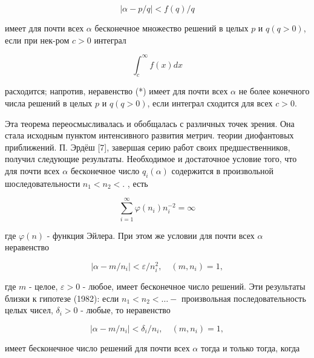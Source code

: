 \documentclass[10pt]{article}
\begin{document}
\[

|\alpha-p / q|<f(q) / q

\]



имеет для почти всех $\alpha$ бесконечное множество решений в целых $p$ и $q(q>0)$, если при нек-ром $c>0$ интеграл



\[

\int_{c}^{\infty} f(x) d x

\]



расходится; напротив, неравенство (*) имеет для почти всех $\alpha$ не более конечного числа решений в целых $p$ и $q(q>0)$, если интеграл сходится для всех $c>0$.



Эта теорема переосмысливалась и обобщалась с различных точек зрения. Она стала исходным пунктом интенсивного развития метрич. теории диофантовых приближений. П. Эрдёш [7], завершая серию работ своих предшественников, получил следующие результаты. Необходимое и достаточное условие того, что для почти всех $\alpha$ бесконечное число $q_{i}(\alpha)$ содержится в произвольной шоследовательности $n_{1}<n_{2}<$. , есть



\[

\sum_{i=1}^{\infty} \varphi\left(n_{i}\right) n_{i}^{-2}=\infty

\]



где $\varphi(n)$ - функция Эйлера. При этом же условии для почти всех $\alpha$ неравенство



\[

\left|\alpha-m / n_{i}\right|<\varepsilon / n_{i}^{2}, \quad\left(m, n_{i}\right)=1,

\]



где $m$ - целое, $\varepsilon>0$ - любое, имеет бесконечное число решений. Эти результаты близки к гипотезе (1982): если $n_{1}<n_{2}<\ldots-$ произвольная последовательность целых чисел, $\delta_{i}>0$ - любые, то неравенство



\[

\left|\alpha-m / n_{i}\right|<\delta_{i} / n_{i}, \quad\left(m, n_{i}\right)=1,

\]



имеет бесконечное число решений для почти всех $\alpha$ тогда и только тогда, когда
\end{document}
